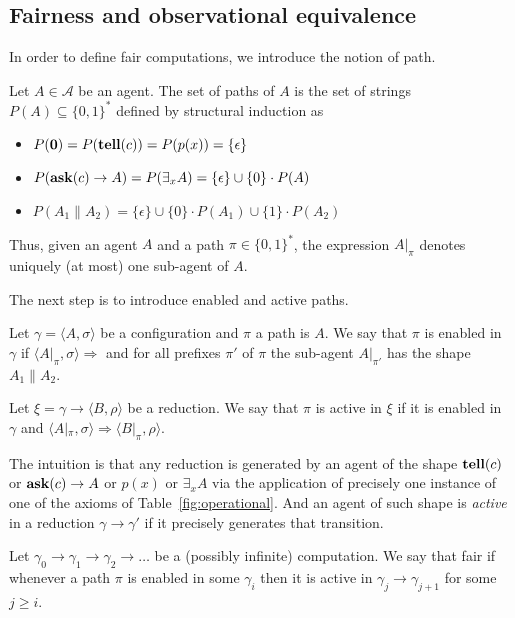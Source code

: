 \documentclass{llncs}
\def\0{{\mathbf 0}}
\newcommand{\tell}{{\bf tell}}
\newcommand{\ask}{{\bf ask}}
\begin{document}
\subsection{Fairness and observational equivalence}
In order to define fair computations, we introduce the notion of path.

\begin{definition}[Paths]
Let $A  \in \mathcal{A}$ be an agent. The set of paths of $A$ is the set of strings 
$P(A) \subseteq {\{0, 1\}^*}$ defined by structural induction as 
\begin{itemize}
\item $P(\0) = P(\tell(c)) = P(p(x)) = \{\epsilon\}$
\item $P(\ask(c) \rightarrow A) = P(\exists_x A) = \{\epsilon\} \cup  \{0\} \cdot P(A)$
\item $P(A_1 \parallel A_2) = \{\epsilon\} \cup  \{0\} \cdot P(A_1) \cup  \{1\} \cdot P(A_2)$
\end{itemize}
\end{definition}

Thus, given an agent $A$ and a path  $\pi \in \{0, 1\}^*$, the expression $A|_\pi$ denotes uniquely (at most) one sub-agent of $A$.

The next step is to introduce enabled and active paths.

\begin{definition}
Let $\gamma = \langle A, \sigma \rangle$ be a configuration and $\pi$ a path is $A$. 
%
We say that $\pi$ is enabled in $\gamma$ if 
$\langle A|_\pi, \sigma \rangle \Rightarrow$ and
for all prefixes $\pi'$ of $\pi$ the sub-agent $A|_{\pi'}$ has the shape
$A_1 \parallel A_2$.

Let $\xi = \gamma \rightarrow \langle B, \rho \rangle$ be a reduction. 
We say that $\pi$ is active in $\xi$ if it is enabled in $\gamma$
and  $\langle A|_\pi, \sigma \rangle  \Rightarrow \langle B|_\pi, \rho \rangle$.
\end{definition}


The intuition is that any reduction is generated by an agent of the shape $\mathit{\tell}(c)$ or  $\mathit{\ask}(c) \rightarrow A$ 
or $p(x)$ or $\exists_x A$ via the application of precisely one instance of one of the axioms
of Table~\ref{fig:operational}.
%
And an agent of such  shape is \emph{active} in a reduction $\gamma \rightarrow \gamma'$ if 
it precisely generates that transition.

\begin{definition}\label{def:fair}
Let $\gamma_0  \rightarrow \gamma_1  \rightarrow \gamma_2 \rightarrow \dots$ be a
(possibly infinite) computation. 
We say that fair if whenever a path
$\pi$ is enabled in some $\gamma_i$ then it is active in  
$\gamma_j  \rightarrow \gamma_{j+1}$ 
for some $j \geq i$.
\end{definition}
\end{document}
